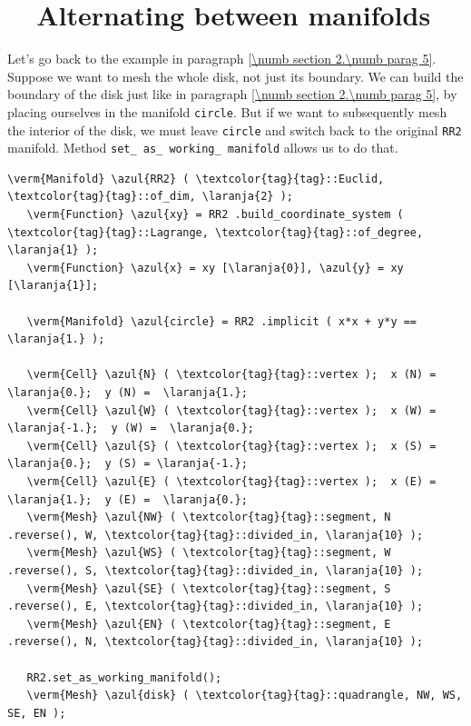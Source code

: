 \section{~~Alternating between manifolds}\label{\numb section 2.\numb parag 9}

Let's go back to the example in paragraph \ref{\numb section 2.\numb parag 5}.
Suppose we want to mesh the whole disk, not just its boundary.
We can build the boundary of the disk just like in paragraph
\ref{\numb section 2.\numb parag 5}, by placing ourselves in the manifold {\small\tt circle}.
But if we want to subsequently mesh the interior of the disk, we must leave {\small\tt circle}
and switch back to the original {\small\tt RR2} manifold.
Method {\small\tt set\_\,as\_\,working\_\,manifold} allows us to do that.

\begin{Verbatim}[commandchars=\\\{\},formatcom=\small\tt,frame=single,
   label=parag-\ref{\numb section 2.\numb parag 9}.cpp,rulecolor=\color{coment},
   baselinestretch=0.94,framesep=2mm]
   \verm{Manifold} \azul{RR2} ( \textcolor{tag}{tag}::Euclid, \textcolor{tag}{tag}::of_dim, \laranja{2} );
   \verm{Function} \azul{xy} = RR2 .build_coordinate_system ( \textcolor{tag}{tag}::Lagrange, \textcolor{tag}{tag}::of_degree, \laranja{1} );
   \verm{Function} \azul{x} = xy [\laranja{0}], \azul{y} = xy [\laranja{1}];
   
   \verm{Manifold} \azul{circle} = RR2 .implicit ( x*x + y*y == \laranja{1.} );
   
   \verm{Cell} \azul{N} ( \textcolor{tag}{tag}::vertex );  x (N) =  \laranja{0.};  y (N) =  \laranja{1.};
   \verm{Cell} \azul{W} ( \textcolor{tag}{tag}::vertex );  x (W) = \laranja{-1.};  y (W) =  \laranja{0.};
   \verm{Cell} \azul{S} ( \textcolor{tag}{tag}::vertex );  x (S) =  \laranja{0.};  y (S) = \laranja{-1.};
   \verm{Cell} \azul{E} ( \textcolor{tag}{tag}::vertex );  x (E) =  \laranja{1.};  y (E) =  \laranja{0.};
   \verm{Mesh} \azul{NW} ( \textcolor{tag}{tag}::segment, N .reverse(), W, \textcolor{tag}{tag}::divided_in, \laranja{10} );
   \verm{Mesh} \azul{WS} ( \textcolor{tag}{tag}::segment, W .reverse(), S, \textcolor{tag}{tag}::divided_in, \laranja{10} );
   \verm{Mesh} \azul{SE} ( \textcolor{tag}{tag}::segment, S .reverse(), E, \textcolor{tag}{tag}::divided_in, \laranja{10} );
   \verm{Mesh} \azul{EN} ( \textcolor{tag}{tag}::segment, E .reverse(), N, \textcolor{tag}{tag}::divided_in, \laranja{10} );
   
   RR2.set_as_working_manifold();
   \verm{Mesh} \azul{disk} ( \textcolor{tag}{tag}::quadrangle, NW, WS, SE, EN );
\end{Verbatim}

